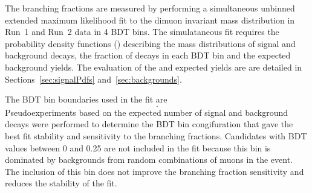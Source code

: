 The branching fractions are measured by performing a simultaneous unbinned extended maximum likelihood fit to the dimuon invariant mass distribution in Run~1 and Run~2 data in 4 BDT bins. 
The simulataneous fit requires the probability density functions (\pdfs) describing the mass distributions of signal and background decays, the fraction of \bmumu decays in each BDT bin and the expected background yields. The evaluation of the \pdfs and expected yields are are detailed in Sections~\ref{sec:signalPdfs} and~\ref{sec:backgrounds}.

The BDT bin boundaries used in the fit are
\begin{equation}
[0.25, 0.4, 0.5, 0.6, 1.0].
\label{eq:BDTbins}
\end{equation}
Pseudoexperiments based on the expected number of signal and background decays were performed to determine the BDT bin congifuration that gave the best fit stability and sensitivity to the \bmumu branching fractions.
Candidates with BDT values between 0 and 0.25 are not included in the fit because this bin is dominated by backgrounds from random combinations of muons in the event. The inclusion of this bin does not improve the branching fraction sensitivity and reduces the stability of the fit. %

